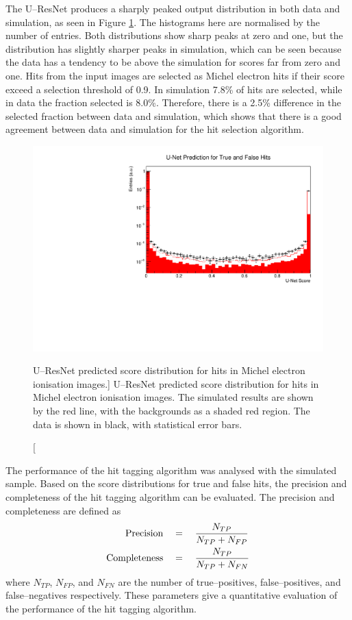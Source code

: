 The U--ResNet produces a sharply peaked output distribution in both data and
simulation, as seen in Figure \ref{fig:unet_pred_data}. The histograms here are
normalised by the number of entries. Both distributions show sharp peaks at zero
and one, but the distribution has slightly sharper peaks in simulation, which 
can be seen because the data has a tendency to be above the simulation for
scores far from zero and one. Hits from the input images are selected as 
Michel electron hits if their score exceed a selection threshold of 0.9. In 
simulation 7.8\% of hits are selected, while in data the fraction selected is 
8.0\%. Therefore, there is a 2.5\% difference in the selected fraction between 
data and simulation, which shows that there is a good agreement between data and
simulation for the hit selection algorithm.
\begin{figure}
	\centering
	\includegraphics[width=\textwidth]{figures/unet_pred_data.pdf}
	\caption
	[U--ResNet predicted score distribution for hits in Michel electron ionisation
	images.]
	{U--ResNet predicted score distribution for hits in Michel electron 
	ionisation images. The simulated results are shown by the red line, with the 
	backgrounds as a shaded red region. The data is shown in black, with 
	statistical error bars.}
	\label{fig:unet_pred_data}
\end{figure}

The performance of the hit tagging algorithm was analysed with the simulated
sample. Based on the score distributions for true and false hits, the precision 
and completeness of the hit tagging algorithm can be evaluated. The precision 
and completeness are defined as 
\begin{align*}
	\mbox{Precision} \quad &= \quad  \frac{N_{TP}}{N_{TP} + N_{FP}} \\
	\vspace{2mm}
	\mbox{Completeness} \quad &= \quad \frac{N_{TP}}{N_{TP} + N_{FN}}
\end{align*}
where $N_{TP}$, $N_{FP}$, and $N_{FN}$ are the number of true--positives,
false--positives, and false--negatives respectively. These parameters give a
quantitative evaluation of the performance of the hit tagging algorithm.


